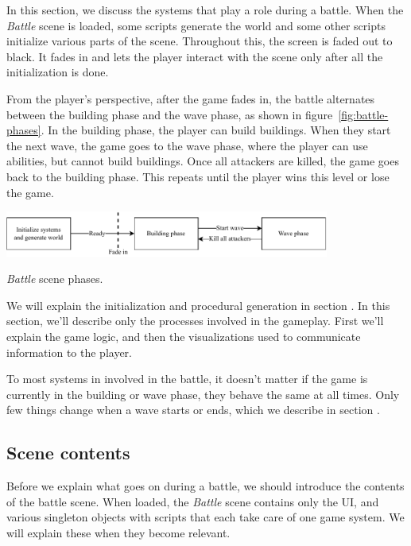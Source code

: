 In this section, we discuss the systems that play a role during a battle.
When the \emph{Battle} scene is loaded, some scripts generate the world and some other scripts initialize various parts of the scene.
Throughout this, the screen is faded out to black.
It fades in and lets the player interact with the scene only after all the initialization is done.

From the player's perspective, after the game fades in, the battle alternates between the building phase and the wave phase, as shown in figure~\ref{fig:battle-phases}.
In the building phase, the player can build buildings.
When they start the next wave, the game goes to the wave phase, where the player can use abilities, but cannot build buildings.
Once all attackers are killed, the game goes back to the building phase.
This repeats until the player wins this level or lose the game.

\begin{center}
    \captionsetup{type=figure}
    \includegraphics[width=0.8\textwidth]{img/battle scene phases.pdf}
    \caption{\emph{Battle} scene phases.}
    \label{fig:battle-phases}
\end{center}

We will explain the initialization and procedural generation in section .
In this section, we'll describe only the processes involved in the gameplay.
First we'll explain the game logic, and then the visualizations used to communicate information to the player.

To most systems in involved in the battle, it doesn't matter if the game is currently in the building or wave phase, they behave the same at all times.
Only few things change when a wave starts or ends, which we describe in section .

\subsection{Scene contents}

Before we explain what goes on during a battle, we should introduce the contents of the battle scene.
When loaded, the \emph{Battle} scene contains only the UI, and various singleton objects with scripts that each take care of one game system.
We will explain these when they become relevant.

